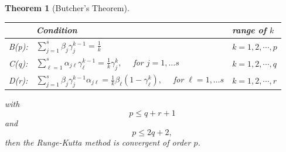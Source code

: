 \documentclass[]{book}
\newtheorem{theorem}{Theorem}[chapter]
\theoremstyle{definition}
\theoremstyle{definition}
\theoremstyle{definition}
\theoremstyle{definition}
\theoremstyle{remark}
\begin{document}
\begin{theorem}[Butcher's Theorem]
\begin{longtable}[]{@{}lll@{}}
\toprule
\begin{minipage}[b]{0.07\columnwidth}\raggedright
\strut
\end{minipage} & \begin{minipage}[b]{0.53\columnwidth}\raggedright
Condition\strut
\end{minipage} & \begin{minipage}[b]{0.31\columnwidth}\raggedright
range of \(k\)\strut
\end{minipage}\tabularnewline
\midrule
\endhead
\begin{minipage}[t]{0.07\columnwidth}\raggedright
B(p):\strut
\end{minipage} & \begin{minipage}[t]{0.53\columnwidth}\raggedright
\(\sum_{j=1}^s\beta_j\gamma_j^{k-1} = \frac 1k\)\strut
\end{minipage} & \begin{minipage}[t]{0.31\columnwidth}\raggedright
\(k=1,2,\cdots,p\)\strut
\end{minipage}\tabularnewline
\begin{minipage}[t]{0.07\columnwidth}\raggedright
C(q):\strut
\end{minipage} & \begin{minipage}[t]{0.53\columnwidth}\raggedright
\(\sum_{\ell=1}^s\alpha_{j\ell}\gamma_\ell^{k-1} = \frac 1k\gamma_j^k,\quad\) for \(j=1,\dotsc s\)\strut
\end{minipage} & \begin{minipage}[t]{0.31\columnwidth}\raggedright
\(k=1,2,\cdots,q\)\strut
\end{minipage}\tabularnewline
\begin{minipage}[t]{0.07\columnwidth}\raggedright
D(r):\strut
\end{minipage} & \begin{minipage}[t]{0.53\columnwidth}\raggedright
\(\sum_{j=1}^s\beta_j\gamma_j^{k-1} \alpha_{j\ell}= \frac 1k\beta_\ell(1-\gamma_\ell^k),\quad\) for \(\ell=1,\dotsc s\)\strut
\end{minipage} & \begin{minipage}[t]{0.31\columnwidth}\raggedright
\(k=1,2,\cdots,r\)\strut
\end{minipage}\tabularnewline
\bottomrule
\end{longtable}

with
\[ p\leq q+r+1 \] and \[ p \leq 2q+2,\] then the Runge-Kutta method is convergent of order \(p\).
\end{theorem}
\end{document}
